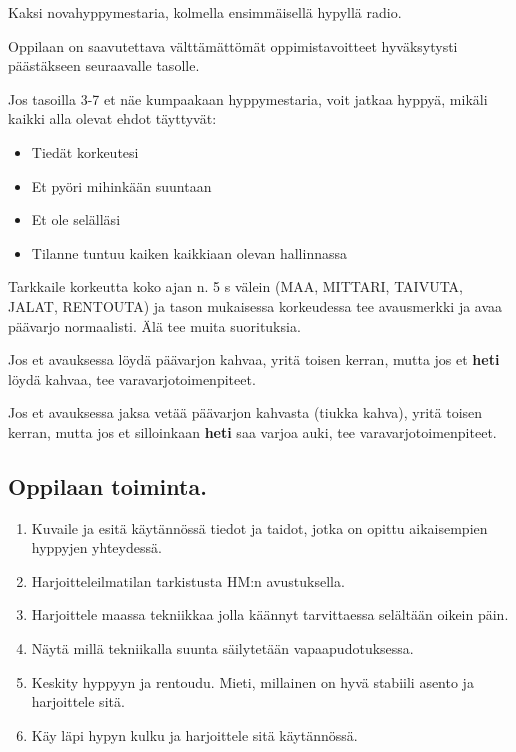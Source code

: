 \begin{multicols}{2}
Kaksi novahyppymestaria, kolmella ensimmäisellä hypyllä radio. 


Oppilaan on saavutettava välttämättömät oppimistavoitteet hyväksytysti päästäkseen seuraavalle tasolle. 


Jos tasoilla 3-7 et näe kumpaakaan hyppymestaria, voit jatkaa hyppyä, mikäli kaikki alla olevat ehdot täyttyvät: 

\begin{itemize}
\item  Tiedät korkeutesi  
\item  Et pyöri mihinkään suuntaan 
\item  Et ole selälläsi 
\item  Tilanne tuntuu kaiken kaikkiaan olevan hallinnassa 
\end{itemize}

Tarkkaile korkeutta koko ajan n. 5 s välein (MAA, MITTARI, TAIVUTA, JALAT, RENTOUTA) ja tason mukaisessa korkeudessa tee avausmerkki ja avaa päävarjo normaalisti. Älä tee muita suorituksia.  


Jos et avauksessa löydä päävarjon kahvaa, yritä toisen kerran, mutta jos et \textbf{heti} löydä kahvaa, tee varavarjotoimenpiteet. 


Jos et avauksessa jaksa vetää päävarjon kahvasta (tiukka kahva), yritä toisen kerran, mutta jos et silloinkaan \textbf{heti} saa varjoa auki, tee varavarjotoimenpiteet. 

\subsection{ Oppilaan toiminta. }
\label{nova-alkeiskoulutuksen-suoritukset-oppilaan-toiminta}

\begin{enumerate}[label=\bfseries \arabic*)]
\item  Kuvaile ja esitä käytännössä tiedot ja taidot, jotka on opittu aikaisempien hyppyjen yhteydessä. 
\item  Harjoitteleilmatilan tarkistusta HM:n avustuksella. 
\item  Harjoittele maassa tekniikkaa jolla käännyt tarvittaessa selältään oikein päin. 
\item  Näytä millä tekniikalla suunta säilytetään vapaapudotuksessa. 
\item  Keskity hyppyyn ja rentoudu. Mieti, millainen on hyvä stabiili asento ja harjoittele sitä. 
\item  Käy läpi hypyn kulku ja harjoittele sitä käytännössä. 
\end{enumerate}

\end{multicols}
